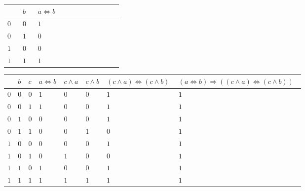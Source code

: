 \documentclass[12pt]{article}
\begin{document}
	\begin{center}
	\begin{longtable}{|>{\centering\arraybackslash}p{0.0999\linewidth}|>{\centering\arraybackslash}p{0.0999\linewidth}|>{\centering\arraybackslash}p{0.5\linewidth}|}
		\hline
		{\small $a$} & {\small $b$} & {\small $a\Leftrightarrow b$}\\ 
		\hline
		$0$ & $0$ & $1$\\ 
		\hline
		$0$ & $1$ & $0$\\ 
		\hline
		$1$ & $0$ & $0$\\ 
		\hline
		$1$ & $1$ & $1$\\ 
		\hline
	\end{longtable}\end{center}
	\begin{center}
	\begin{longtable}{|>{\centering\arraybackslash}p{0.0137\linewidth}|>{\centering\arraybackslash}p{0.0137\linewidth}|>{\centering\arraybackslash}p{0.0137\linewidth}|>{\centering\arraybackslash}p{0.0686\linewidth}|>{\centering\arraybackslash}p{0.0411\linewidth}|>{\centering\arraybackslash}p{0.0411\linewidth}|>{\centering\arraybackslash}p{0.1784\linewidth}|>{\centering\arraybackslash}p{0.3294\linewidth}|}
		\hline
		{\small $a$} & {\small $b$} & {\small $c$} & {\small $a\Leftrightarrow b$} & {\small $c\wedge a$} & {\small $c\wedge b$} & {\small $(c\wedge a)\Leftrightarrow (c\wedge b)$} & {\small $(a\Leftrightarrow b)\Rightarrow ((c\wedge a)\Leftrightarrow (c\wedge b))$}\\ 
		\hline
		$0$ & $0$ & $0$ & $1$ & $0$ & $0$ & $1$ & $1$\\ 
		\hline
		$0$ & $0$ & $1$ & $1$ & $0$ & $0$ & $1$ & $1$\\ 
		\hline
		$0$ & $1$ & $0$ & $0$ & $0$ & $0$ & $1$ & $1$\\ 
		\hline
		$0$ & $1$ & $1$ & $0$ & $0$ & $1$ & $0$ & $1$\\ 
		\hline
		$1$ & $0$ & $0$ & $0$ & $0$ & $0$ & $1$ & $1$\\ 
		\hline
		$1$ & $0$ & $1$ & $0$ & $1$ & $0$ & $0$ & $1$\\ 
		\hline
		$1$ & $1$ & $0$ & $1$ & $0$ & $0$ & $1$ & $1$\\ 
		\hline
		$1$ & $1$ & $1$ & $1$ & $1$ & $1$ & $1$ & $1$\\ 
		\hline
	\end{longtable}\end{center}
\end{document}
